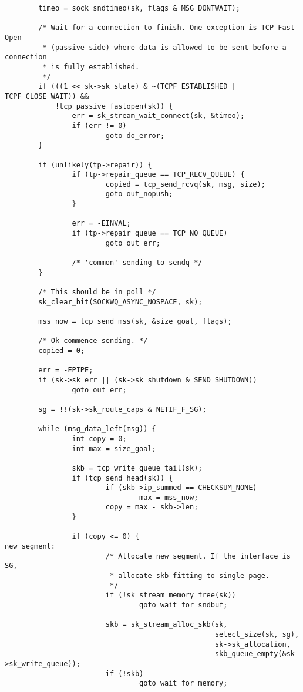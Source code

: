 \begin{verbatim}
        timeo = sock_sndtimeo(sk, flags & MSG_DONTWAIT);

        /* Wait for a connection to finish. One exception is TCP Fast Open
         * (passive side) where data is allowed to be sent before a connection
         * is fully established.
         */
        if (((1 << sk->sk_state) & ~(TCPF_ESTABLISHED | TCPF_CLOSE_WAIT)) &&
            !tcp_passive_fastopen(sk)) {
                err = sk_stream_wait_connect(sk, &timeo);
                if (err != 0)
                        goto do_error;
        }

        if (unlikely(tp->repair)) {
                if (tp->repair_queue == TCP_RECV_QUEUE) {
                        copied = tcp_send_rcvq(sk, msg, size);
                        goto out_nopush;
                }

                err = -EINVAL;
                if (tp->repair_queue == TCP_NO_QUEUE)
                        goto out_err;

                /* 'common' sending to sendq */
        }

        /* This should be in poll */
        sk_clear_bit(SOCKWQ_ASYNC_NOSPACE, sk);

        mss_now = tcp_send_mss(sk, &size_goal, flags);

        /* Ok commence sending. */
        copied = 0;

        err = -EPIPE;
        if (sk->sk_err || (sk->sk_shutdown & SEND_SHUTDOWN))
                goto out_err;

        sg = !!(sk->sk_route_caps & NETIF_F_SG);

        while (msg_data_left(msg)) {
                int copy = 0;
                int max = size_goal;

                skb = tcp_write_queue_tail(sk);
                if (tcp_send_head(sk)) {
                        if (skb->ip_summed == CHECKSUM_NONE)
                                max = mss_now;
                        copy = max - skb->len;
                }

                if (copy <= 0) {
new_segment:
                        /* Allocate new segment. If the interface is SG,
                         * allocate skb fitting to single page.
                         */
                        if (!sk_stream_memory_free(sk))
                                goto wait_for_sndbuf;

                        skb = sk_stream_alloc_skb(sk,
                                                  select_size(sk, sg),
                                                  sk->sk_allocation,
                                                  skb_queue_empty(&sk->sk_write_queue));
                        if (!skb)
                                goto wait_for_memory;


\end{verbatim}
